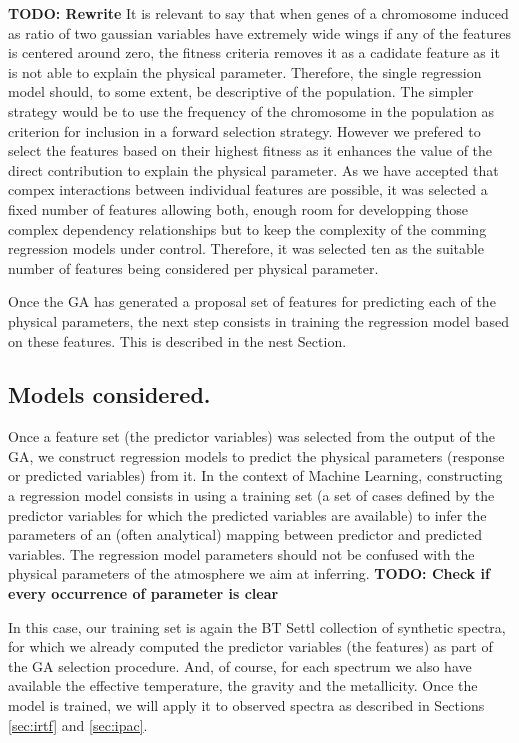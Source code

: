 {{\bf TODO: Rewrite} It is relevant to say that when genes of a
chromosome induced as ratio of two gaussian variables have extremely
wide wings if any of the features is centered around zero, the fitness
criteria removes it as a cadidate feature as it is not able to explain
the physical parameter.  Therefore, the single regression model
should, to some extent, be descriptive of the population. The simpler
strategy would be to use the frequency of the chromosome in the
population as criterion for inclusion in a forward selection
strategy. However we prefered to select the features based on their
highest fitness as it enhances the value of the direct contribution to
explain the physical parameter.  As we have accepted that compex
interactions between individual features are possible, it was selected
a fixed number of features allowing both, enough room for developping
those complex dependency relationships but to keep the complexity of
the comming regression models under control.  Therefore, it was
selected ten as the suitable number of features being considered per
physical parameter.

Once the GA has generated a proposal set of features for predicting
each of the physical parameters, the next step consists in training
the regression model based on these features. This is described in the
nest Section.

\subsection{Models considered.}
\label {ssub:models}

Once a feature set (the predictor variables) was selected from the
output of the GA, we construct regression models to predict the
physical parameters (response or predicted variables) from it. In the
context of Machine Learning, constructing a regression model consists
in using a training set (a set of cases defined by the predictor
variables for which the predicted variables are available) to infer
the parameters of an (often analytical) mapping between predictor and
predicted variables. The regression model parameters should not be
confused with the physical parameters of the atmosphere we aim at
inferring. {\bf TODO: Check if every occurrence of parameter is clear}

In this case, our training set is again the BT Settl collection of
synthetic spectra, for which we already computed the predictor
variables (the features) as part of the GA selection procedure. And,
of course, for each spectrum we also have available the effective
temperature, the gravity and the metallicity. Once the model is
trained, we will apply it to observed spectra as described in
Sections \ref{sec:irtf} and \ref{sec:ipac}.  

}

